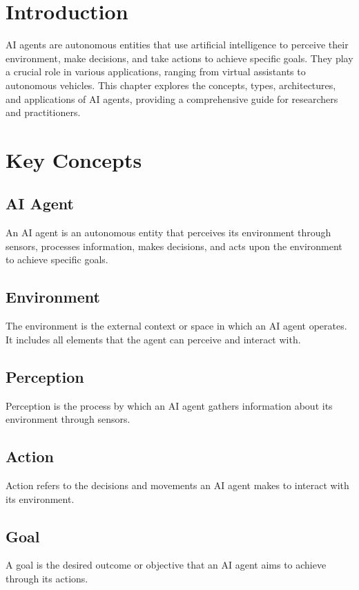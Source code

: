 \section{Introduction}
AI agents are autonomous entities that use artificial intelligence to perceive their environment, make decisions, and take actions to achieve specific goals. They play a crucial role in various applications, ranging from virtual assistants to autonomous vehicles. This chapter explores the concepts, types, architectures, and applications of AI agents, providing a comprehensive guide for researchers and practitioners.

\section{Key Concepts}

\subsection{AI Agent}
An AI agent is an autonomous entity that perceives its environment through sensors, processes information, makes decisions, and acts upon the environment to achieve specific goals.

\subsection{Environment}
The environment is the external context or space in which an AI agent operates. It includes all elements that the agent can perceive and interact with.

\subsection{Perception}
Perception is the process by which an AI agent gathers information about its environment through sensors.

\subsection{Action}
Action refers to the decisions and movements an AI agent makes to interact with its environment.

\subsection{Goal}
A goal is the desired outcome or objective that an AI agent aims to achieve through its actions.

